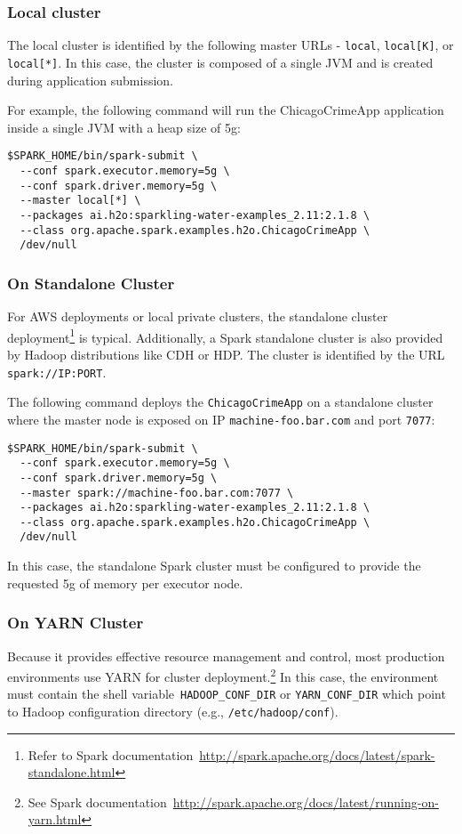 \subsubsection{Local cluster}
The local cluster is identified by the following master URLs - \texttt{local}, \texttt{local[K]}, or \texttt{local[*]}. In this case, the cluster is composed of a single JVM and is created during application submission.

For example, the following command will run the ChicagoCrimeApp application inside a single JVM with a heap size of 5g:
\begin{lstlisting}[style=Bash]
$SPARK_HOME/bin/spark-submit \ 
  --conf spark.executor.memory=5g \
  --conf spark.driver.memory=5g \
  --master local[*] \
  --packages ai.h2o:sparkling-water-examples_2.11:2.1.8 \
  --class org.apache.spark.examples.h2o.ChicagoCrimeApp \
  /dev/null
\end{lstlisting}

\subsubsection{On Standalone Cluster}
For AWS deployments or local private clusters, the standalone cluster deployment\footnote{Refer to Spark documentation~\url{http://spark.apache.org/docs/latest/spark-standalone.html}} is typical. Additionally, a Spark standalone cluster is also provided by Hadoop distributions like CDH or HDP. The cluster is identified by the URL \texttt{spark://IP:PORT}.

The following command deploys the \texttt{ChicagoCrimeApp} on a standalone cluster where the master node is exposed on IP \texttt{machine-foo.bar.com} and port \texttt{7077}:

\begin{lstlisting}[style=Bash]
$SPARK_HOME/bin/spark-submit \ 
  --conf spark.executor.memory=5g \
  --conf spark.driver.memory=5g \
  --master spark://machine-foo.bar.com:7077 \
  --packages ai.h2o:sparkling-water-examples_2.11:2.1.8 \
  --class org.apache.spark.examples.h2o.ChicagoCrimeApp \
  /dev/null
\end{lstlisting}

In this case, the standalone Spark cluster must be configured to provide the requested 5g of memory per executor node. 

\subsubsection{On YARN Cluster}
Because it provides effective resource management and control, most production environments use YARN for cluster deployment.\footnote{See Spark documentation~\url{http://spark.apache.org/docs/latest/running-on-yarn.html}} 
In this case, the environment must contain the shell variable~\texttt{HADOOP\_CONF\_DIR} or \texttt{YARN\_CONF\_DIR} which point to Hadoop configuration directory (e.g., \texttt{/etc/hadoop/conf}).

